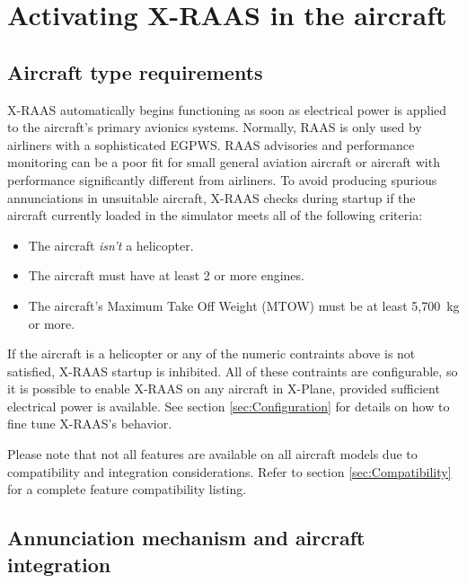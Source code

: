 \documentclass[a4paper,12pt]{article}
\begin{document}
\section{Activating X-RAAS in the aircraft}
\label{sec:ActivatingXRAAS}

\subsection{Aircraft type requirements}
\label{subsec:AircraftTypes}

X-RAAS automatically begins functioning as soon as electrical power is
applied to the aircraft's primary avionics systems. Normally, RAAS is
only used by airliners with a sophisticated EGPWS. RAAS advisories and
performance monitoring can be a poor fit for small general aviation
aircraft or aircraft with performance significantly different from
airliners. To avoid producing spurious annunciations in unsuitable
aircraft, X-RAAS checks during startup if the aircraft currently loaded
in the simulator meets all of the following criteria:

\begin{itemize}

\item The aircraft \emph{isn't} a helicopter.

\item The aircraft must have at least 2 or more engines.

\item The aircraft's Maximum Take Off Weight (MTOW) must be at least
5,700 kg or more.

\end{itemize}

\noindent If the aircraft is a helicopter or any of the numeric
contraints above is not satisfied, X-RAAS startup is inhibited. All of
these contraints are configurable, so it is possible to enable X-RAAS on
any aircraft in X-Plane, provided sufficient electrical power is
available. See section \ref{sec:Configuration} for details on how to fine
tune X-RAAS's behavior.

Please note that not all features are available on all aircraft models
due to compatibility and integration considerations. Refer to section
\ref{sec:Compatibility} for a complete feature compatibility listing.

\subsection{Annunciation mechanism and aircraft integration}
\label{sec:AnnunciationMechanism}
\end{document}
